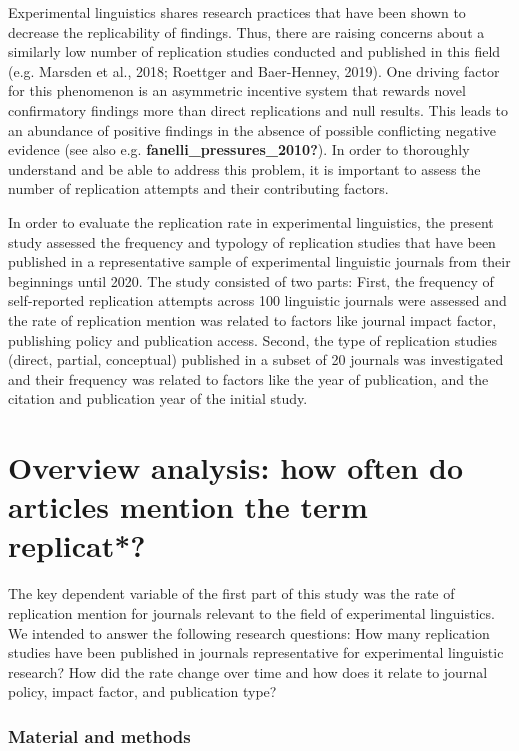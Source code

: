 \documentclass[]{elsarticle} %
\begin{document}
Experimental linguistics shares research practices that have been shown
to decrease the replicability of findings. Thus, there are raising
concerns about a similarly low number of replication studies conducted
and published in this field (e.g. Marsden et al., 2018; Roettger and
Baer-Henney, 2019). One driving factor for this phenomenon is an
asymmetric incentive system that rewards novel confirmatory findings
more than direct replications and null results. This leads to an
abundance of positive findings in the absence of possible conflicting
negative evidence (see also e.g. \textbf{fanelli\_pressures\_2010?}). In
order to thoroughly understand and be able to address this problem, it
is important to assess the number of replication attempts and their
contributing factors.

In order to evaluate the replication rate in experimental linguistics,
the present study assessed the frequency and typology of replication
studies that have been published in a representative sample of
experimental linguistic journals from their beginnings until 2020. The
study consisted of two parts: First, the frequency of self-reported
replication attempts across 100 linguistic journals were assessed and
the rate of replication mention was related to factors like journal
impact factor, publishing policy and publication access. Second, the
type of replication studies (direct, partial, conceptual) published in a
subset of 20 journals was investigated and their frequency was related
to factors like the year of publication, and the citation and
publication year of the initial study.

\hypertarget{overview-analysis-how-often-do-articles-mention-the-term-replicat}{%
\section{Overview analysis: how often do articles mention the term
replicat*?}\label{overview-analysis-how-often-do-articles-mention-the-term-replicat}}

The key dependent variable of the first part of this study was the rate
of replication mention for journals relevant to the field of
experimental linguistics. We intended to answer the following research
questions: How many replication studies have been published in journals
representative for experimental linguistic research? How did the rate
change over time and how does it relate to journal policy, impact
factor, and publication type?

\hypertarget{material-and-methods}{%
\subsubsection{Material and methods}\label{material-and-methods}}
\end{document}
